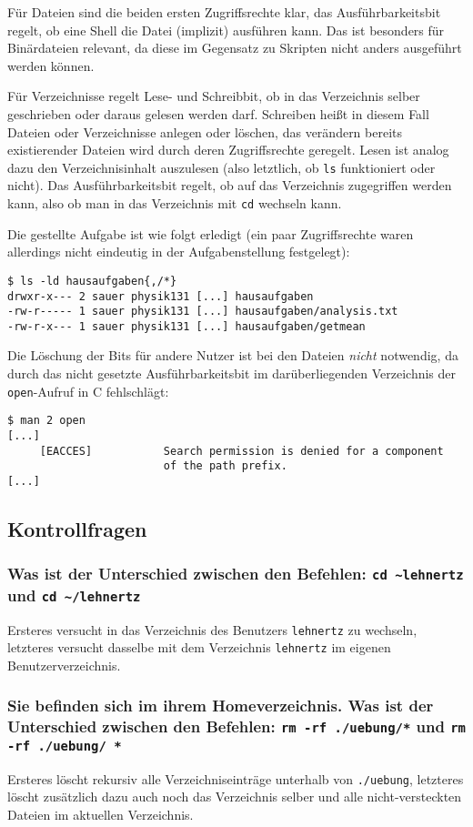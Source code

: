 Für Dateien sind die beiden ersten Zugriffsrechte klar, das Ausführbarkeitsbit
regelt, ob eine Shell die Datei (implizit) ausführen kann. Das ist besonders für
Binärdateien relevant, da diese im Gegensatz zu Skripten nicht anders ausgeführt
werden können.

Für Verzeichnisse regelt Lese- und Schreibbit, ob in das Verzeichnis selber
geschrieben oder daraus gelesen werden darf. Schreiben heißt in diesem Fall
Dateien oder Verzeichnisse anlegen oder löschen, das verändern bereits
existierender Dateien wird durch deren Zugriffsrechte geregelt. Lesen ist analog
dazu den Verzeichnisinhalt auszulesen (also letztlich, ob \lstinline'ls'
funktioniert oder nicht). Das Ausführbarkeitsbit regelt, ob auf das Verzeichnis
zugegriffen werden kann, also ob man in das Verzeichnis mit \lstinline'cd'
wechseln kann.

Die gestellte Aufgabe ist wie folgt erledigt (ein paar Zugriffsrechte waren
allerdings nicht eindeutig in der Aufgabenstellung festgelegt):
\begin{lstlisting}
$ ls -ld hausaufgaben{,/*}
drwxr-x--- 2 sauer physik131 [...] hausaufgaben
-rw-r----- 1 sauer physik131 [...] hausaufgaben/analysis.txt
-rw-r-x--- 1 sauer physik131 [...] hausaufgaben/getmean
\end{lstlisting}
Die Löschung der Bits für andere Nutzer ist bei den Dateien \emph{nicht}
notwendig, da durch das nicht gesetzte Ausführbarkeitsbit im darüberliegenden
Verzeichnis der \lstinline'open'-Aufruf in C fehlschlägt:
\begin{verbatim}
$ man 2 open
[...]
     [EACCES]           Search permission is denied for a component
                        of the path prefix.
[...]
\end{verbatim}

\subsection{Kontrollfragen}
\subsubsection*{Was ist der Unterschied zwischen den Befehlen: \lstinline'cd
~lehnertz' und \lstinline'cd ~/lehnertz'}
Ersteres versucht in das Verzeichnis des Benutzers \verb'lehnertz' zu wechseln,
letzteres versucht dasselbe mit dem Verzeichnis \verb'lehnertz' im eigenen
Benutzerverzeichnis.

\subsubsection*{Sie befinden sich im ihrem Homeverzeichnis. Was ist der
Unterschied zwischen den Befehlen: \lstinline'rm -rf ./uebung/*' und
\lstinline'rm -rf ./uebung/ *'}
Ersteres löscht rekursiv alle Verzeichniseinträge unterhalb von \verb'./uebung',
letzteres löscht zusätzlich dazu auch noch das Verzeichnis selber und alle
nicht-versteckten Dateien im aktuellen Verzeichnis.

